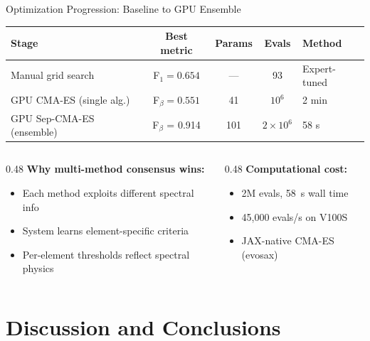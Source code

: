 \documentclass[aspectratio=169,10pt]{beamer}
\begin{document}
\begin{frame}{Optimization Progression: Baseline to GPU Ensemble}
	\centering
	{\small
	\begin{tabular}{lcccl}
		\toprule
		\textbf{Stage} & \textbf{Best metric} & \textbf{Params} & \textbf{Evals} & \textbf{Method} \\
		\midrule
		Manual grid search & F$_1 = 0.654$ & --- & 93 & Expert-tuned \\
		GPU CMA-ES (single alg.) & F$_\beta = 0.551$ & 41 & $10^6$ & 2 min \\
		\alert{GPU Sep-CMA-ES (ensemble)} & \alert{F$_\beta$ = 0.914} & \alert{101} & \alert{$2 \times 10^6$} & \alert{58 s} \\
		\bottomrule
	\end{tabular}}

	\vspace{0.4em}
	\begin{columns}[T]
		\begin{column}{0.48\textwidth}
			{\small\textbf{Why multi-method consensus wins:}}
			\begin{itemize}
				\item {\small Each method exploits different spectral info}
				\item {\small System learns element-specific criteria}
				\item {\small Per-element thresholds reflect spectral physics}
			\end{itemize}
		\end{column}
		\begin{column}{0.48\textwidth}
			{\small\textbf{Computational cost:}}
			\begin{itemize}
				\item {\small 2M evals, \alert{58~s} wall time}
				\item {\small 45,000 evals/s on V100S}
				\item {\small JAX-native CMA-ES (evosax)}
			\end{itemize}
		\end{column}
	\end{columns}
\end{frame}

\section{Discussion and Conclusions}
\end{document}
